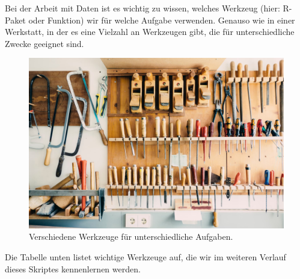 \documentclass[
]{book}
\begin{document}
Bei der Arbeit mit Daten ist es wichtig zu wissen, welches Werkzeug (hier: R-Paket oder Funktion) wir für welche Aufgabe verwenden. Genauso wie in einer Werkstatt, in der es eine Vielzahl an Werkzeugen gibt, die für unterschiedliche Zwecke geeignet sind.

\begin{figure}
\includegraphics[width=1\linewidth]{fig/tool_set} \caption{Verschiedene Werkzeuge für unterschiedliche Aufgaben.}\label{fig:fig-werkzeuge}
\end{figure}

Die Tabelle unten listet wichtige Werkzeuge auf, die wir im weiteren Verlauf dieses Skriptes kennenlernen werden.
\end{document}
